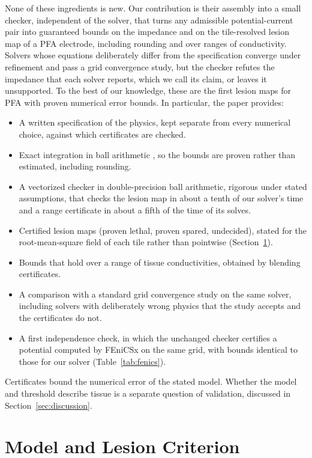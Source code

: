 \documentclass[11pt]{article}
\begin{document}
None of these ingredients is new. Our contribution is their assembly into a
small checker, independent of the solver, that turns any admissible
potential-current pair into guaranteed bounds on the impedance and on the
tile-resolved lesion map of a PFA electrode, including rounding and over
ranges of conductivity. Solvers whose equations deliberately differ from the
specification converge under refinement and pass a grid convergence study, but
the checker refutes the impedance that each solver reports, which we call its
claim, or leaves it unsupported. To the best of our
knowledge, these are the first lesion maps for PFA with proven numerical error
bounds. In particular, the paper provides:
\begin{itemize}
\item A written specification of the physics, kept separate from every
numerical choice, against which certificates are checked.
\item Exact integration in ball arithmetic \cite{arb}, so the bounds are proven
rather than estimated, including rounding.
\item A vectorized checker in double-precision ball arithmetic, rigorous under
stated assumptions, that checks the lesion map in about a tenth of our solver's time
and a range certificate in about a fifth of the time of its solves.
\item Certified lesion maps (proven lethal, proven spared, undecided), stated for
the root-mean-square field of each tile rather than pointwise
(Section~\ref{sec:model}).
\item Bounds that hold over a range of tissue conductivities, obtained by blending certificates.
\item A comparison with a standard grid convergence study on the same solver,
including solvers with deliberately wrong physics that the study accepts and
the certificates do not.
\item A first independence check, in which the unchanged checker certifies a potential
computed by FEniCSx on the same grid, with bounds identical to those for our
solver (Table~\ref{tab:fenics}).
\end{itemize}

Certificates bound the numerical error of the stated model. Whether the model
and threshold describe tissue is a separate question of validation, discussed in
Section~\ref{sec:discussion}.

\section{Model and Lesion Criterion}\label{sec:model}
\end{document}
